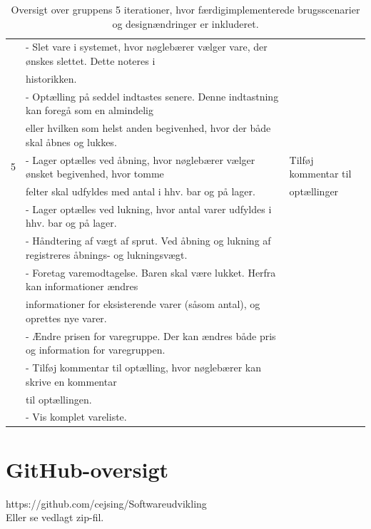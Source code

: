 \documentclass[]{article}
\begin{document}
\begin{table}[!h]
\begin{tabular}{|l|l|l|}
  & - Slet vare i systemet, hvor nøglebærer vælger vare, der ønskes slettet. Dette noteres i & \\
  & historikken. & \\
  & - Optælling på seddel indtastes senere. Denne indtastning kan foregå som en almindelig & \\ 
  & eller hvilken som helst anden begivenhed, hvor der både skal åbnes og lukkes. &  \\ \hline
5 & - Lager optælles ved åbning, hvor nøglebærer vælger ønsket begivenhed, hvor tomme & Tilføj kommentar til \\
  & felter skal udfyldes med antal i hhv. bar og på lager. & optællinger  \\
  & - Lager optælles ved lukning, hvor antal varer udfyldes i hhv. bar og på lager. & \\
  & - Håndtering af vægt af sprut. Ved åbning og lukning af registreres åbnings- og lukningsvægt. & \\
  & - Foretag varemodtagelse. Baren skal være lukket. Herfra kan informationer ændres & \\
  & informationer for eksisterende varer (såsom antal), og oprettes nye varer. & \\
  & - Ændre prisen for varegruppe. Der kan ændres både pris og information for varegruppen. & \\
  & - Tilføj kommentar til optælling, hvor nøglebærer kan skrive en kommentar & \\
  & til optællingen. & \\
  & - Vis komplet vareliste. &  \\ \hline
\end{tabular}
\caption[Oversigt over delafleveringer]{Oversigt over gruppens 5 iterationer, hvor færdigimplementerede brugsscenarier og designændringer er inkluderet.}
\label{Delafleveringer}
\end{table}

\newpage


\section{GitHub-oversigt}
https://github.com/cejsing/Softwareudvikling \\
Eller se vedlagt zip-fil.
\end{document}
